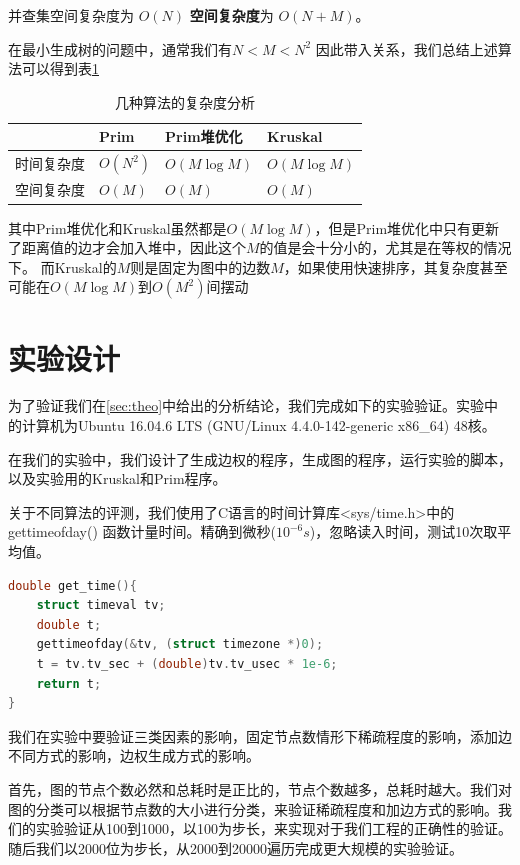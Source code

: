 \documentclass[UTF8]{ctexart}
\begin{document}
并查集空间复杂度为 $O(N)$ \textbf{空间复杂度}为 $O(N+M)$。


在最小生成树的问题中，通常我们有$N<M<N^2$ 因此带入关系，我们总结上述算法可以得到表\ref{tab:comp}

\begin{table}[htbp]
    \centering
    \begin{tabular}{|l|l|l|l|}
    \hline
          & Prim & Prim堆优化 & Kruskal \\ \hline
    时间复杂度 &  $O(N^2)$    &     $O(M\log M)$    &     $O(M\log M)$    \\ \hline
    空间复杂度 &  $O(M)$      &     $O(M)$          &     $O(M)$          \\ \hline
    \end{tabular}
    \caption{几种算法的复杂度分析}
    \label{tab:comp}
\end{table}



其中Prim堆优化和Kruskal虽然都是$O(M\log M)$，但是Prim堆优化中只有更新了距离值的边才会加入堆中，因此这个$M$的值是会十分小的，尤其是在等权的情况下。
而Kruskal的$M$则是固定为图中的边数$M$，如果使用快速排序，其复杂度甚至可能在$O(M\log M)$到$O(M^2)$间摆动


\section{实验设计}\label{ss:design}
为了验证我们在\ref{sec:theo}中给出的分析结论，我们完成如下的实验验证。实验中的计算机为Ubuntu 16.04.6 LTS (GNU/Linux 4.4.0-142-generic x86\_64) 48核。

在我们的实验中，我们设计了生成边权的程序，生成图的程序，运行实验的脚本，以及实验用的Kruskal和Prim程序。

关于不同算法的评测，我们使用了C语言的时间计算库<sys/time.h>中的gettimeofday() 函数计量时间。精确到微秒(\(10^{-6}s\))，忽略读入时间，测试10次取平均值。

\begin{lstlisting}[language=c]
double get_time(){
	struct timeval tv;
	double t;
	gettimeofday(&tv, (struct timezone *)0);
	t = tv.tv_sec + (double)tv.tv_usec * 1e-6;
	return t;
}
\end{lstlisting}

我们在实验中要验证三类因素的影响，固定节点数情形下稀疏程度的影响，添加边不同方式的影响，边权生成方式的影响。

首先，图的节点个数必然和总耗时是正比的，节点个数越多，总耗时越大。我们对图的分类可以根据节点数的大小进行分类，来验证稀疏程度和加边方式的影响。我们的实验验证从100到1000，以100为步长，来实现对于我们工程的正确性的验证。
随后我们以2000位为步长，从2000到20000遍历完成更大规模的实验验证。
\end{document}

